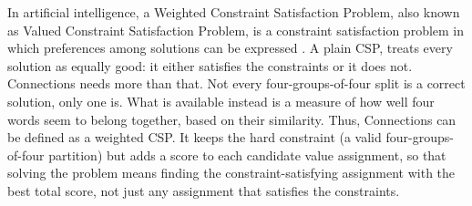 In artificial intelligence, a Weighted Constraint Satisfaction Problem, also known as Valued Constraint Satisfaction Problem, is a constraint satisfaction problem in which preferences among solutions can be expressed \cite{gallardoSolvingWeightedConstraint2009}. A plain \ac{CSP}, treats every solution as equally good: it either satisfies the constraints or it does not. Connections needs more than that. Not every four-groups-of-four split is a correct solution, only one is. What is available instead is a measure of how well four words seem to belong together, based on their similarity. Thus, Connections can be defined as a weighted \ac{CSP}. It keeps the hard constraint (a valid four-groups-of-four partition) but adds a score to each candidate value assignment, so that solving the problem means finding the constraint-satisfying assignment with the best total score, not just any assignment that satisfies the constraints.

